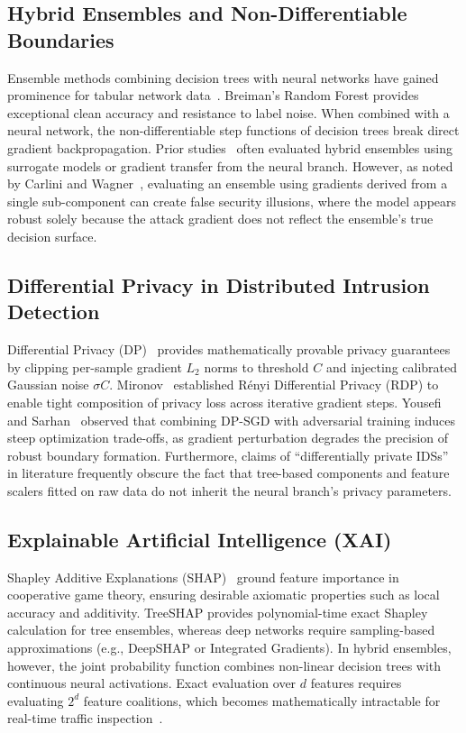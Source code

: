 \documentclass[10pt,journal,compsoc,twocolumn]{IEEEtran}
\begin{document}
\subsection{Hybrid Ensembles and Non-Differentiable Boundaries}
Ensemble methods combining decision trees with neural networks have gained prominence for tabular network data~\cite{breiman2001random, yousefi2023differentially}. Breiman's Random Forest provides exceptional clean accuracy and resistance to label noise. When combined with a neural network, the non-differentiable step functions of decision trees break direct gradient backpropagation. Prior studies~\cite{papernot2016crafting} often evaluated hybrid ensembles using surrogate models or gradient transfer from the neural branch. However, as noted by Carlini and Wagner~\cite{carlini2017towards}, evaluating an ensemble using gradients derived from a single sub-component can create false security illusions, where the model appears robust solely because the attack gradient does not reflect the ensemble's true decision surface.

\subsection{Differential Privacy in Distributed Intrusion Detection}
Differential Privacy (DP)~\cite{abadi2016deep} provides mathematically provable privacy guarantees by clipping per-sample gradient $L_2$ norms to threshold $C$ and injecting calibrated Gaussian noise $\sigma C$. Mironov~\cite{mironov2017renyi} established R{\'e}nyi Differential Privacy (RDP) to enable tight composition of privacy loss across iterative gradient steps. Yousefi and Sarhan~\cite{yousefi2023differentially} observed that combining DP-SGD with adversarial training induces steep optimization trade-offs, as gradient perturbation degrades the precision of robust boundary formation. Furthermore, claims of ``differentially private IDSs'' in literature frequently obscure the fact that tree-based components and feature scalers fitted on raw data do not inherit the neural branch's privacy parameters.

\subsection{Explainable Artificial Intelligence (XAI)}
Shapley Additive Explanations (SHAP)~\cite{lundberg2017unified} ground feature importance in cooperative game theory, ensuring desirable axiomatic properties such as local accuracy and additivity. TreeSHAP provides polynomial-time exact Shapley calculation for tree ensembles, whereas deep networks require sampling-based approximations (e.g., DeepSHAP or Integrated Gradients). In hybrid ensembles, however, the joint probability function combines non-linear decision trees with continuous neural activations. Exact evaluation over $d$ features requires evaluating $2^d$ feature coalitions, which becomes mathematically intractable for real-time traffic inspection~\cite{sharaf2024identifying}.
\end{document}
